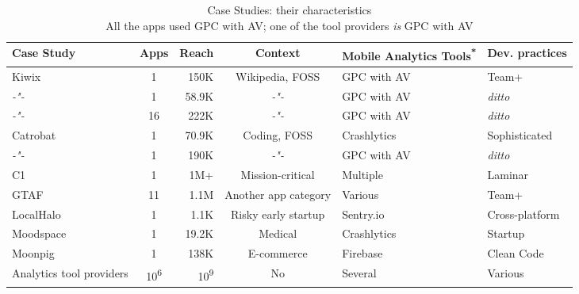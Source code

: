 \begin{table}
    \centering
    \tabcolsep=0.06cm
    \footnotesize
    \begin{tabular}{lcrcll}\toprule
    Case Study               & Apps                 & Reach & Context & Mobile Analytics Tools\textsuperscript{*}  &Dev. practices  \\
    \midrule
    Kiwix                    &                    1 &  150K & Wikipedia, FOSS            & GPC with AV &          Team+ \\ 
     \textit{-"-}            &                    1 & 58.9K & \textit{-"-}   & GPC with AV & \textit{ditto} \\
     \textit{-"-}            &                   16 &  222K & \textit{-"-}   & GPC with AV & \textit{ditto} \\
    Catrobat                 &                    1 & 70.9K & Coding, FOSS            & Crashlytics &  Sophisticated \\
     \textit{-"-}            &                    1 &  190K & \textit{-"-}   & GPC with AV & \textit{ditto} \\
    C1                       &                    1 &  1M+  & Mission-critical &    Multiple &        Laminar \\
    GTAF                     &                   11 &  1.1M & Another app category             &     Various &          Team+ \\
    LocalHalo                &                    1 &  1.1K & Risky early startup &   Sentry.io & Cross-platform \\
    Moodspace                &                    1 & 19.2K & Medical    & Crashlytics &        Startup \\
    Moonpig                  &                    1 & 138K  & E-commerce &    Firebase &     Clean Code \\
    Analytics tool providers &10\textsuperscript{6} &10\textsuperscript{9} & No &  Several &        Various \\
    \bottomrule
    \end{tabular}
    \caption[Case Studies: their characteristics]{Case Studies: their characteristics \\ {\tiny * All the apps used GPC with AV; one of the tool providers \emph{is} GPC with AV}}
    \label{tab:case-studies-their-characteristics}
\end{table}


